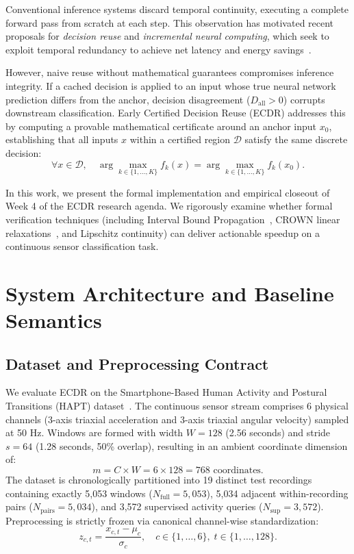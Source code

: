 \documentclass[10pt,twocolumn]{article}
\begin{document}
Conventional inference systems discard temporal continuity, executing a complete forward pass from scratch at each step. This observation has motivated recent proposals for \textit{decision reuse} and \textit{incremental neural computing}, which seek to exploit temporal redundancy to achieve net latency and energy savings~\cite{xiang2026lipcache,kechris2024streaminnc,huang2026tinydejavu}.

However, naive reuse without mathematical guarantees compromises inference integrity. If a cached decision is applied to an input whose true neural network prediction differs from the anchor, decision disagreement ($D_{\text{all}} > 0$) corrupts downstream classification. Early Certified Decision Reuse (ECDR) addresses this by computing a provable mathematical certificate around an anchor input $x_0$, establishing that all inputs $x$ within a certified region $\mathcal{D}$ satisfy the same discrete decision:
\begin{equation}
\forall x \in \mathcal{D}, \quad \arg\max_{k \in \{1,\dots,K\}} f_k(x) = \arg\max_{k \in \{1,\dots,K\}} f_k(x_0).
\end{equation}

In this work, we present the formal implementation and empirical closeout of Week 4 of the ECDR research agenda. We rigorously examine whether formal verification techniques (including Interval Bound Propagation~\cite{gowal2018effectiveness}, CROWN linear relaxations~\cite{zhang2018efficient,xu2020fast}, and Lipschitz continuity) can deliver actionable speedup on a continuous sensor classification task.

\section{System Architecture and Baseline Semantics}

\subsection{Dataset and Preprocessing Contract}
We evaluate ECDR on the Smartphone-Based Human Activity and Postural Transitions (HAPT) dataset~\cite{reyes2016transition}. The continuous sensor stream comprises 6 physical channels (3-axis triaxial acceleration and 3-axis triaxial angular velocity) sampled at 50 Hz.
Windows are formed with width $W = 128$ (2.56 seconds) and stride $s = 64$ (1.28 seconds, 50\% overlap), resulting in an ambient coordinate dimension of:
\begin{equation}
m = C \times W = 6 \times 128 = 768 \text{ coordinates}.
\end{equation}
The dataset is chronologically partitioned into 19 distinct test recordings containing exactly 5,053 windows ($N_{\text{full}} = 5,053$), 5,034 adjacent within-recording pairs ($N_{\text{pairs}} = 5,034$), and 3,572 supervised activity queries ($N_{\text{sup}} = 3,572$). Preprocessing is strictly frozen via canonical channel-wise standardization:
\begin{equation}
z_{c, t} = \frac{x_{c, t} - \mu_c}{\sigma_c}, \quad c \in \{1,\dots,6\}, \; t \in \{1,\dots,128\}.
\end{equation}
\end{document}
